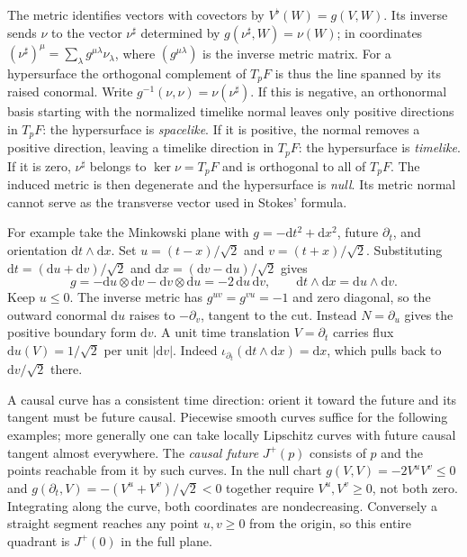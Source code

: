 The metric identifies vectors with covectors by $V^\flat(W)=g(V,W)$. Its inverse sends $\nu$ to the vector $\nu^\sharp$ determined by $g(\nu^\sharp,W)=\nu(W)$; in coordinates ${(\nu^\sharp)}^\mu=\sum_\lambda g^{\mu\lambda}\nu_\lambda$, where $(g^{\mu\lambda})$ is the inverse metric matrix. For a hypersurface the orthogonal complement of $T_p F$ is thus the line spanned by its raised conormal. Write $g^{-1}(\nu,\nu)=\nu(\nu^\sharp)$. If this is negative, an orthonormal basis starting with the normalized timelike normal leaves only positive directions in $T_p F$: the hypersurface is \emph{spacelike}. If it is positive, the normal removes a positive direction, leaving a timelike direction in $T_p F$: the hypersurface is \emph{timelike}. If it is zero, $\nu^\sharp$ belongs to $\ker\nu=T_p F$ and is orthogonal to all of $T_p F$. The induced metric is then degenerate and the hypersurface is \emph{null}. Its metric normal cannot serve as the transverse vector used in Stokes' formula.

For example take the Minkowski plane with $g=-\mathrm{d}t^2+\mathrm{d}x^2$, future $\partial_t$, and orientation $\mathrm{d}t\wedge\mathrm{d}x$. Set $u=(t-x)/\sqrt{2}$ and $v=(t+x)/\sqrt{2}$. Substituting $\mathrm{d}t=(\mathrm{d}u+\mathrm{d}v)/\sqrt{2}$ and $\mathrm{d}x=(\mathrm{d}v-\mathrm{d}u)/\sqrt{2}$ gives
\[
 g=-\mathrm{d}u\otimes\mathrm{d}v-\mathrm{d}v\otimes\mathrm{d}u
     =-2\,\mathrm{d}u\,\mathrm{d}v,\qquad
 \mathrm{d}t\wedge\mathrm{d}x=\mathrm{d}u\wedge\mathrm{d}v .
\]
Keep $u\leq0$. The inverse metric has $g^{uv}=g^{vu}=-1$ and zero diagonal, so the outward conormal $\mathrm{d}u$ raises to $-\partial_v$, tangent to the cut. Instead $N=\partial_u$ gives the positive boundary form $\mathrm{d}v$. A unit time translation $V=\partial_t$ carries flux $\mathrm{d}u(V)=1/\sqrt{2}$ per unit $|\mathrm{d}v|$. Indeed $\iota_{\partial_t}(\mathrm{d}t\wedge\mathrm{d}x)=\mathrm{d}x$, which pulls back to $\mathrm{d}v/\sqrt{2}$ there.

A causal curve has a consistent time direction: orient it toward the future and its tangent must be future causal. Piecewise smooth curves suffice for the following examples; more generally one can take locally Lipschitz curves with future causal tangent almost everywhere. The \emph{causal future} $J^+(p)$ consists of $p$ and the points reachable from it by such curves. In the null chart $g(V,V)=-2V^u V^v\leq0$ and $g(\partial_t,V)=-(V^u+V^v)/\sqrt{2}<0$ together require $V^u,V^v\geq0$, not both zero. Integrating along the curve, both coordinates are nondecreasing. Conversely a straight segment reaches any point $u,v\geq0$ from the origin, so this entire quadrant is $J^+(0)$ in the full plane.

